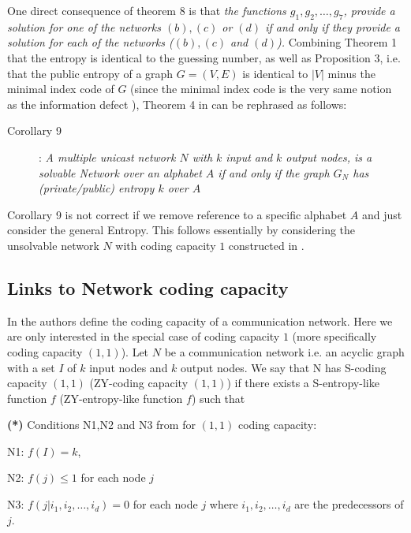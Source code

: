 \documentclass[12pt]{article}
\begin{document}
One direct consequence of theorem 8 is that {\it the functions $g_1,g_2,\ldots,g_7$, provide 
a solution for one of the networks  $(b),(c)$ or $(d)$ if and only if they provide a solution for each of the networks ($(b),(c)$ and $(d)$).}  
Combining Theorem 1 that the entropy is identical to the guessing number, as well as Proposition 3, i.e. that the public entropy of a graph $G=(V,E)$ is identical to $|V|$ minus the minimal index code of $G$ (since the minimal index code is the very same notion as the information defect \cite{Riis05,Riis07}),  Theorem 4 in \cite{Riis07} can be rephrased as follows:

\begin{description}

\item[Corollary 9]: 
{\it A multiple unicast network $N$ with $k$ input and $k$ output nodes, is a solvable Network over an alphabet $A$ if and only if the graph $G_N$ has (private/public) entropy $k$ over $A$}
\end{description}
 
Corollary 9 is not correct if we remove reference to a specific alphabet $A$ and just consider the general Entropy. This follows essentially by considering the unsolvable network $N$ with coding capacity $1$ constructed in \cite{Cdfz}.

 \subsection{Links to Network coding capacity}
In \cite{DFZ07} the authors define the coding capacity of a communication network. Here we are only interested in the special case of coding capacity $1$ (more specifically coding capacity $(1,1)$). Let $N$ be a communication network i.e.
an acyclic graph with a set $I$ of $k$ input nodes and $k$ output nodes. We say that N has S-coding capacity $(1,1)$ (ZY-coding capacity $(1,1)$) if there exists a S-entropy-like function $f$ (ZY-entropy-like function $f$) such that

\bigskip

\noindent
{\bf (*)}  Conditions N1,N2 and N3 from \cite{DFZ07} for $(1,1)$ coding capacity:

\smallskip

\noindent
N1:   $f(I)=k$, 

\smallskip

\noindent
N2:  $f(j) \leq 1$ for each node $j$ 

\smallskip

\noindent
N3:  $f(j | i_1,i_2, \ldots,i_d)=0$ for each node $j$ where $i_1,i_2, \ldots,i_d$ are the predecessors 
of $j$. 
\end{document}
